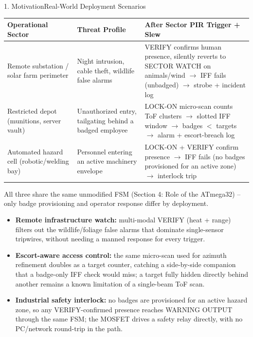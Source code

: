 \documentclass[aspectratio=169, 10pt]{beamer}
\begin{document}
\begin{frame}{1. Motivation}{Real-World Deployment Scenarios}
    \tiny
    \begin{table}
        \centering
        \begin{tabular}{p{2.7cm} p{3.0cm} p{5.3cm}}
            \toprule
            \textbf{\color{Accent} Operational Sector} & \textbf{\color{Accent} Threat Profile} & \textbf{\color{Accent} After Sector PIR Trigger + Slew} \\
            \midrule
            Remote substation / solar farm perimeter & Night intrusion, cable theft, wildlife false alarms & VERIFY confirms human presence, silently reverts to SECTOR WATCH on animals/wind $\rightarrow$ IFF fails (unbadged) $\rightarrow$ strobe + incident log \\
            Restricted depot (munitions, server vault) & Unauthorized entry, tailgating behind a badged employee & LOCK-ON micro-scan counts ToF clusters $\rightarrow$ slotted IFF window $\rightarrow$ badges $<$ targets $\rightarrow$ alarm + escort-breach log \\
            Automated hazard cell (robotic/welding bay) & Personnel entering an active machinery envelope & LOCK-ON + VERIFY confirm presence $\rightarrow$ IFF fails (no badges provisioned for an active zone) $\rightarrow$ interlock trip \\
            \bottomrule
        \end{tabular}
    \end{table}
    \vspace{0.1cm}
    {\tiny\color{TextDim} All three share the same unmodified FSM (Section 4: Role of the ATmega32) -- only badge provisioning and operator response differ by deployment.}
    \vspace{0.1cm}
    \footnotesize
    \begin{itemize}
        \item \textbf{Remote infrastructure watch:} multi-modal VERIFY (heat + range) filters out the wildlife/foliage false alarms that dominate single-sensor tripwires, without needing a manned response for every trigger.
        \item \textbf{Escort-aware access control:} the same micro-scan used for azimuth refinement doubles as a target counter, catching a side-by-side companion that a badge-only IFF check would miss; a target fully hidden directly behind another remains a known limitation of a single-beam ToF scan.
        \item \textbf{Industrial safety interlock:} no badges are provisioned for an active hazard zone, so any VERIFY-confirmed presence reaches WARNING OUTPUT through the same FSM; the MOSFET drives a safety relay directly, with no PC/network round-trip in the path.
    \end{itemize}
\end{frame}
\end{document}
